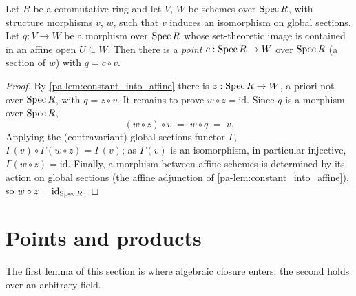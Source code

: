 \begin{lemma}
  \label{pa-lem:constant_into_affine_over}
  \leanok

  Let \(R\) be a commutative ring and let \(V\), \(W\) be schemes over \(\operatorname{Spec} R\), with
  structure morphisms \(v\), \(w\), such that \(v\) induces an isomorphism on global
  sections. Let \(q : V \to W\) be a morphism over \(\operatorname{Spec} R\) whose set-theoretic image is
  contained in an affine open \(U \subseteq W\). Then there is a \emph{point}
  \(c : \operatorname{Spec} R \to W\) over \(\operatorname{Spec} R\) (a section of \(w\)) with \(q = c \circ v\).
\end{lemma}
\begin{proof}
  \leanok
  By \ref{pa-lem:constant_into_affine} there is \(z : \operatorname{Spec} R \to W\), a priori not over
  \(\operatorname{Spec} R\), with \(q = z \circ v\). It remains to prove \(w \circ z = \mathrm{id}\).
  Since \(q\) is a morphism over \(\operatorname{Spec} R\),
  \[
    (w \circ z) \circ v \;=\; w \circ q \;=\; v .
  \]
  Applying the (contravariant) global-sections functor \(\Gamma\),
  \(\Gamma(v) \circ \Gamma(w \circ z) = \Gamma(v)\); as \(\Gamma(v)\) is an isomorphism, in
  particular injective, \(\Gamma(w \circ z) = \mathrm{id}\). Finally, a morphism between
  affine schemes is determined by its action on global sections (the affine adjunction of
  \ref{pa-lem:constant_into_affine}), so \(w \circ z = \mathrm{id}_{\operatorname{Spec} R}\).
\end{proof}

\section{Points and products}
\label{pa-sec:points_products}

The first lemma of this section is where algebraic closure enters; the second holds over an
arbitrary field.

